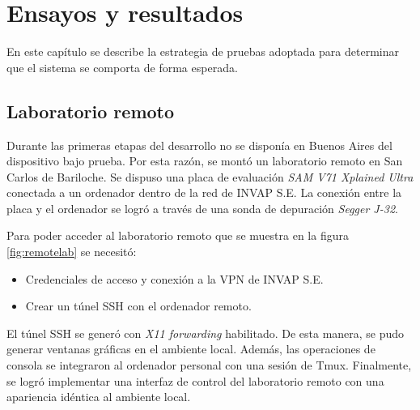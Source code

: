 
\chapter{Ensayos y resultados} %

\label{Chapter4} %

En este capítulo se describe la estrategia de pruebas adoptada para determinar que el sistema se comporta de forma esperada.


\section{Laboratorio remoto}
\label{sec:lab}

Durante las primeras etapas del desarrollo no se disponía en Buenos Aires del dispositivo bajo prueba.
Por esta razón, se montó un laboratorio remoto en San Carlos de Bariloche.
Se dispuso una placa de evaluación \emph{SAM V71 Xplained Ultra} conectada a un ordenador dentro de la red de INVAP S.E.
La conexión entre la placa y el ordenador se logró a través de una sonda de depuración \emph{Segger J-32}.

Para poder acceder al laboratorio remoto que se muestra en la figura \ref{fig:remotelab} se necesitó:

\begin{itemize}
    \item Credenciales de acceso y conexión a la VPN de INVAP S.E.
    \item Crear un túnel SSH con el ordenador remoto.
\end{itemize}

El túnel SSH se generó con \emph{X11 forwarding} habilitado.
De esta manera, se pudo generar ventanas gráficas en el ambiente local.
Además, las operaciones de consola se integraron al ordenador personal con una sesión de Tmux.
Finalmente, se logró implementar una interfaz de control del laboratorio remoto con una apariencia idéntica al ambiente local.

